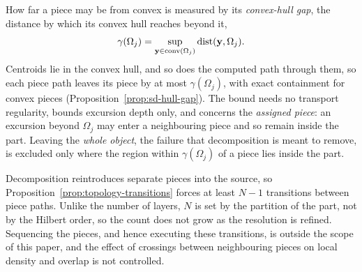 How far a piece may be from convex is measured by its \emph{convex-hull gap}, the distance by which its convex hull reaches beyond it,
\[
  \gamma(\Omega_j)=\sup_{{\bm{\mathrm{y}}}\in\operatorname{conv}(\Omega_j)}\operatorname{dist}({\bm{\mathrm{y}}},\Omega_j).
\]
Centroids lie in the convex hull, and so does the computed path through them, so each piece path leaves its piece by at most $\gamma(\Omega_j)$, with exact containment for convex pieces (Proposition~\ref{prop:sd-hull-gap}). The bound needs no transport regularity, bounds excursion depth only, and concerns the \emph{assigned piece}: an excursion beyond $\Omega_j$ may enter a neighbouring piece and so remain inside the part. Leaving the \emph{whole object}, the failure that decomposition is meant to remove, is excluded only where the region within $\gamma(\Omega_j)$ of a piece lies inside the part.

Decomposition reintroduces separate pieces into the source, so Proposition~\ref{prop:topology-transitions} forces at least $N-1$ transitions between piece paths. Unlike the number of layers, $N$ is set by the partition of the part, not by the Hilbert order, so the count does not grow as the resolution is refined. Sequencing the pieces, and hence executing these transitions, is outside the scope of this paper, and the effect of crossings between neighbouring pieces on local density and overlap is not controlled.
